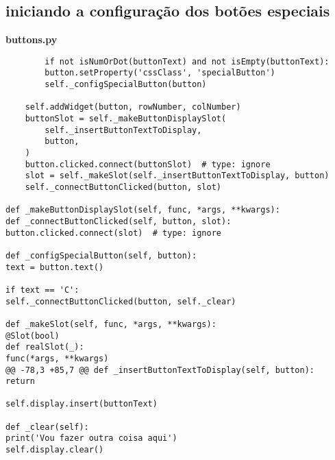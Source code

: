 \documentclass[12pt,a4paper]{article}
\begin{document}
    \subsection{iniciando a configuração dos botões especiais}
    \textbf{buttons.py}
    \begin{lstlisting}
        if not isNumOrDot(buttonText) and not isEmpty(buttonText):
        button.setProperty('cssClass', 'specialButton')
        self._configSpecialButton(button)

    self.addWidget(button, rowNumber, colNumber)
    buttonSlot = self._makeButtonDisplaySlot(
        self._insertButtonTextToDisplay,
        button,
    )
    button.clicked.connect(buttonSlot)  # type: ignore
    slot = self._makeSlot(self._insertButtonTextToDisplay, button)
    self._connectButtonClicked(button, slot)

def _makeButtonDisplaySlot(self, func, *args, **kwargs):
def _connectButtonClicked(self, button, slot):
button.clicked.connect(slot)  # type: ignore

def _configSpecialButton(self, button):
text = button.text()

if text == 'C':
self._connectButtonClicked(button, self._clear)

def _makeSlot(self, func, *args, **kwargs):
@Slot(bool)
def realSlot(_):
func(*args, **kwargs)
@@ -78,3 +85,7 @@ def _insertButtonTextToDisplay(self, button):
return

self.display.insert(buttonText)

def _clear(self):
print('Vou fazer outra coisa aqui')
self.display.clear()
    \end{lstlisting}
\end{document}
